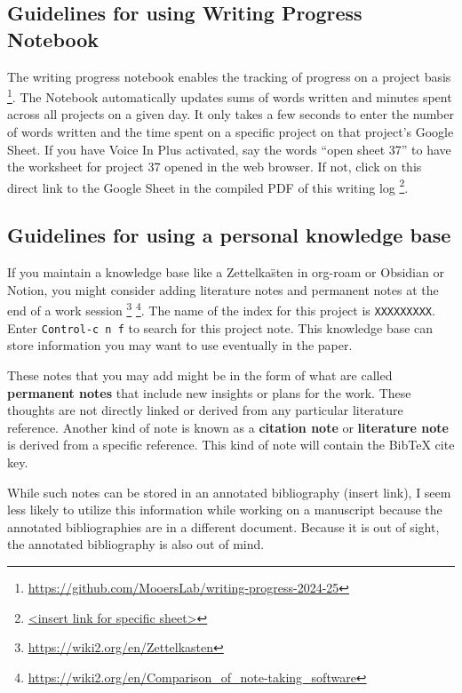 \documentclass[10pt,letterpaper]{article}
\begin{document}
\begin{description}
\subsection{Guidelines for using Writing Progress Notebook}
\label{subsec:guides:wpnb}

The writing progress notebook enables the tracking of progress on a project basis \footnote{\url{https://github.com/MooersLab/writing-progress-2024-25}}.
The Notebook automatically updates sums of words written and minutes spent across all projects on a given day.
It only takes a few seconds to enter the number of words written and the time spent on a specific project on that project's Google Sheet. 
If you have Voice In Plus activated, say the words ``open sheet 37'' to have the worksheet for project 37 opened in the web browser.
If not, click on this direct link to the Google Sheet in the compiled PDF of this writing log \footnote{\url{<insert link for specific sheet>}}.




\subsection{Guidelines for using a personal knowledge base}
\label{subsec:guides:knowledgebase}

If you maintain a knowledge base like a Zettelka\"sten  in org-roam or Obsidian or Notion, you might consider adding literature notes and permanent notes at the end of a work session \footnote{\url{https://wiki2.org/en/Zettelkasten}} \footnote{\url{https://wiki2.org/en/Comparison_of_note-taking_software}}.
The name of the index for this project is \verb|XXXXXXXXX|.
Enter \texttt{Control-c n f} to search for this project note.
This knowledge base can store information you may want to use eventually in the paper.

These notes that you may add might be in the form of what are called \textbf{permanent notes} that include new insights or plans for the work.
These thoughts are not directly linked or derived from any particular literature reference.
Another kind of note is known as a \textbf{citation note} or \textbf{literature note} is derived from a specific reference.
This kind of note will contain the BibTeX cite key.

While such notes can be stored in an annotated bibliography (insert link), I seem less likely to utilize this information while working on a manuscript because the annotated bibliographies are in a different document.
Because it is out of sight, the annotated bibliography is also out of mind.


\end{description}
\end{document}
